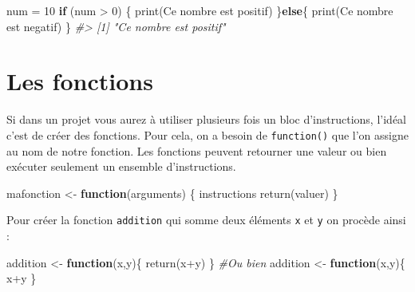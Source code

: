 \documentclass[
]{book}
\newenvironment{Shaded}{\begin{snugshade}}{\end{snugshade}}
\newcommand{\CommentTok}[1]{\textcolor[rgb]{0.56,0.35,0.01}{\textit{#1}}}
\newcommand{\ControlFlowTok}[1]{\textcolor[rgb]{0.13,0.29,0.53}{\textbf{#1}}}
\newcommand{\DecValTok}[1]{\textcolor[rgb]{0.00,0.00,0.81}{#1}}
\newcommand{\FunctionTok}[1]{\textcolor[rgb]{0.00,0.00,0.00}{#1}}
\newcommand{\NormalTok}[1]{#1}
\newcommand{\OtherTok}[1]{\textcolor[rgb]{0.56,0.35,0.01}{#1}}
\newcommand{\SpecialCharTok}[1]{\textcolor[rgb]{0.00,0.00,0.00}{#1}}
\newcommand{\StringTok}[1]{\textcolor[rgb]{0.31,0.60,0.02}{#1}}
\begin{document}
\begin{Shaded}
\begin{Highlighting}[]
\NormalTok{num }\OtherTok{=} \DecValTok{10}
\ControlFlowTok{if}\NormalTok{ (num }\SpecialCharTok{\textgreater{}} \DecValTok{0}\NormalTok{) \{}
  \FunctionTok{print}\NormalTok{(}\StringTok{\textquotesingle{}Ce nombre est positif\textquotesingle{}}\NormalTok{)}
\NormalTok{\}}\ControlFlowTok{else}\NormalTok{\{}
  \FunctionTok{print}\NormalTok{(}\StringTok{\textquotesingle{}Ce nombre est negatif\textquotesingle{}}\NormalTok{)}
\NormalTok{\}}
\CommentTok{\#\textgreater{} [1] "Ce nombre est positif"}
\end{Highlighting}
\end{Shaded}

\hypertarget{les-fonctions}{%
\section{Les fonctions}\label{les-fonctions}}

Si dans un projet vous aurez à utiliser plusieurs fois un bloc d'instructions, l'idéal c'est de créer des fonctions. Pour cela, on a besoin de \texttt{function()} que l'on assigne au nom de notre fonction.
Les fonctions peuvent retourner une valeur ou bien exécuter seulement un ensemble d'instructions.

\begin{Shaded}
\begin{Highlighting}[]
\NormalTok{mafonction  }\OtherTok{\textless{}{-}} \ControlFlowTok{function}\NormalTok{(arguments) \{}
\NormalTok{  instructions}
  \FunctionTok{return}\NormalTok{(valuer)}
\NormalTok{\}}
\end{Highlighting}
\end{Shaded}

Pour créer la fonction \texttt{addition} qui somme deux éléments \texttt{x} et \texttt{y} on procède ainsi :

\begin{Shaded}
\begin{Highlighting}[]
\NormalTok{addition }\OtherTok{\textless{}{-}} \ControlFlowTok{function}\NormalTok{(x,y)\{}
  \FunctionTok{return}\NormalTok{(x}\SpecialCharTok{+}\NormalTok{y)}
\NormalTok{\}}
\CommentTok{\#Ou bien}
\NormalTok{addition }\OtherTok{\textless{}{-}} \ControlFlowTok{function}\NormalTok{(x,y)\{}
\NormalTok{  x}\SpecialCharTok{+}\NormalTok{y}
\NormalTok{\}}
\end{Highlighting}
\end{Shaded}
\end{document}
